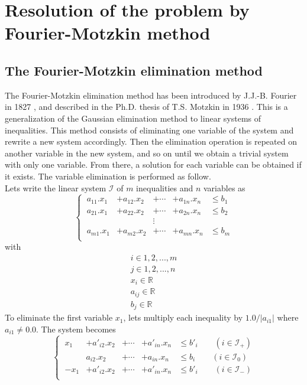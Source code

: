 \documentclass[12pt, a4paper]{article}
\begin{document}
\section{Resolution of the problem by Fourier-Motzkin method}

\subsection{The Fourier-Motzkin elimination method}

The Fourier-Motzkin elimination method has been introduced by J.J.-B. Fourier in 1827 \cite{fourier}, and described in the Ph.D. thesis of T.S. Motzkin in 1936 \cite{motzkin}. This is a generalization of the Gaussian elimination method to linear systems of inequalities. This method consists of eliminating one variable of the system and rewrite a new system accordingly. Then the elimination operation is repeated on another variable in the new system, and so on until we obtain a trivial system with only one variable. From there, a solution for each variable can be obtained if it exists. The variable elimination is performed as follow.\\
Lets write the linear system $\mathcal{I}$ of $m$ inequalities and $n$ variables as 
\begin{equation}
\left\{\
\begin{array}{ccccc}
a_{11}.x_1&+a_{12}.x_2&+\cdots&+a_{1n}.x_n &\le b_1\\
a_{21}.x_1&+a_{22}.x_2&+\cdots&+a_{2n}.x_n &\le b_2\\
&&\vdots&&\\
a_{m1}.x_1&+a_{m2}.x_2&+\cdots&+a_{mn}.x_n &\le b_m\\
\end{array}
\right.
\end{equation}
with
\begin{equation}
\begin{array}{c}
i\in{1, 2, ..., m}\\
j\in{1, 2, ..., n}\\
x_i\in\mathbb{R}\\
a_{ij}\in\mathbb{R}\\
b_j\in\mathbb{R} 
\end{array}
\end{equation}
To eliminate the first variable $x_1$, lets multiply each inequality by $1.0/|a_{i1}|$ where $a_{i1}\not=0.0$. The system becomes
\begin{equation}
\label{eqn_elim_system}
\left\{\
\begin{array}{ccccc}
x_1&+a'_{i2}.x_2&+\cdots&+a'_{in}.x_n &\le b'_i\qquad(i\in\mathcal{I}_+)\\
&a_{i2}.x_2&+\cdots&+a_{in}.x_n &\le b_i\qquad(i\in\mathcal{I}_0)\\
-x_1&+a'_{i2}.x_2&+\cdots&+a'_{in}.x_n &\le b'_i\qquad(i\in\mathcal{I}_-)\\
\end{array}
\right.
\end{equation}
\end{document}
